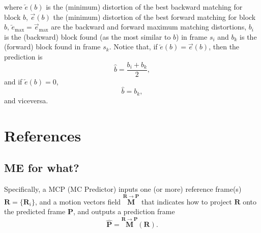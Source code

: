 \begin{enumerate}
\begin{enumerate}
    where $\overleftarrow{e}(b)$ is the (minimum) distortion of the
    best backward matching for block $b$, $\overrightarrow{e}(b)$
    the (minimum) distortion of the best forward matching for block
    $b$,
    $\overleftarrow{e}_{\text{max}}=\overrightarrow{e}_{\text{max}}$ are
    the backward and forward maximum matching distortions, $b_i$ is
    the (backward) block found (as the most similar to $b$) in frame
    $s_i$ and $b_k$ is the (forward) block found in frame
    $s_k$. Notice that, if
    $\overleftarrow{e}(b)=\overrightarrow{e}(b)$, then the
    prediction is
    \begin{equation}
      \hat{b} = \frac{b_i + b_k}{2},
    \end{equation}
    and if $\overleftarrow{e}(b)=0$,
    \begin{equation}
      \hat{b} = b_k,
    \end{equation} and viceversa.
  \end{enumerate}
\end{enumerate}


\section{References}

\renewcommand{\addcontentsline}[3]{}%





\subsection{ME for what?}

Specifically, a MCP (MC Predictor) inputs one (or more) reference
frame(s) ${\mathbf R}=\{{\mathbf R}_i\}$, and a motion vectors field
$\overset{{\mathbf R}\rightarrow{\mathbf P}}{\mathbf M}$ that
indicates how to project ${\mathbf R}$ onto the predicted frame ${\mathbf P}$, and outputs
a prediction frame
\begin{equation}
  \hat{{\mathbf P}} =  \overset{{\mathbf R}\rightarrow {\mathbf P}}{\mathbf M}({\mathbf R}).
  \label{eq:MCP1}
\end{equation}


